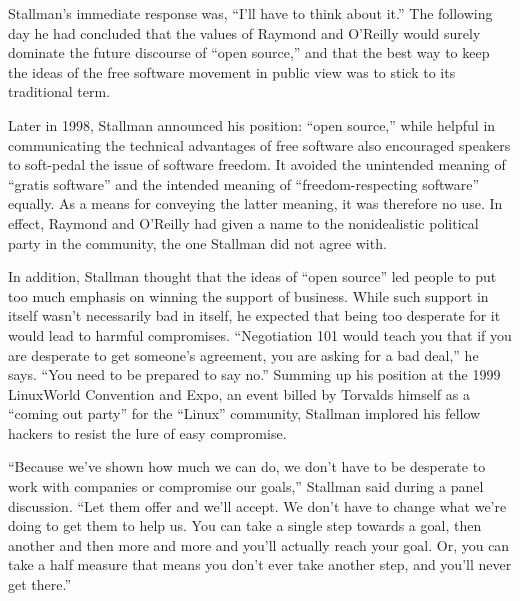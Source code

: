 \ifdefined\chs

\fi

\ifdefined\eng
Stallman's immediate response was, ``I'll have to think about it.''  The following day he had concluded that the values of Raymond and O'Reilly would surely dominate the future discourse of ``open source,'' and that the best way to keep the ideas of the free software movement in public view was to stick to its traditional term.
\fi

\ifdefined\chs

\fi

\ifdefined\eng
Later in 1998, Stallman announced his position: ``open source,'' while helpful in communicating the technical advantages of free software also encouraged speakers to soft-pedal the issue of software freedom. It avoided the unintended meaning of ``gratis software'' and the intended meaning of ``freedom-respecting software'' equally.  As a means for conveying the latter meaning, it was therefore no use.  In effect, Raymond and O'Reilly had given a name to the nonidealistic political party in the community, the one Stallman did not agree with.
\fi

\ifdefined\chs

\fi

\ifdefined\eng
In addition, Stallman thought that the ideas of ``open source'' led people to put too much emphasis on winning the support of business.  While such support in itself wasn't necessarily bad in itself, he expected that being too desperate for it would lead to harmful compromises.  ``Negotiation 101 would teach you that if you are desperate to get someone's agreement, you are asking for a bad deal,'' he says.  ``You need to be prepared to say no.''  Summing up his position at the 1999 LinuxWorld Convention and Expo, an event billed by Torvalds himself as a ``coming out party'' for the ``Linux'' community, Stallman implored his fellow hackers to resist the lure of easy compromise.
\fi

\ifdefined\chs

\fi

\ifdefined\eng
``Because we've shown how much we can do, we don't have to be desperate to work with companies or compromise our goals,'' Stallman said during a panel discussion. ``Let them offer and we'll accept. We don't have to change what we're doing to get them to help us. You can take a single step towards a goal, then another and then more and more and you'll actually reach your goal. Or, you can take a half measure that means you don't ever take another step, and you'll never get there.''
\fi


